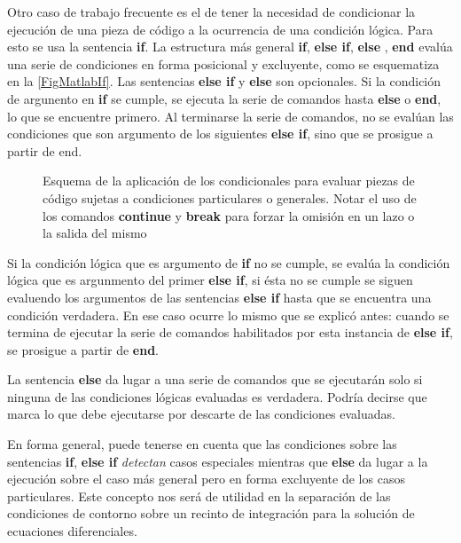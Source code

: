 
Otro caso de trabajo frecuente es el de tener 
la necesidad de condicionar la ejecución de 
una pieza de código a la ocurrencia de una 
condición lógica. Para esto se usa la sentencia
\textbf{if}. La estructura más general \textbf{if},
\textbf{else if}, \textbf{else} , \textbf{end} evalúa
una serie de condiciones en forma posicional  y 
excluyente, como se esquematiza en la 
\autoref{FigMatlabIf}. Las sentencias \textbf{else if} y 
\textbf{else} son opcionales. Si la condición 
de argunento en \textbf{if} se cumple, se ejecuta
la serie de comandos hasta \textbf{else} o 
\textbf{end}, lo que se encuentre primero. Al 
terminarse la serie de comandos, no se evalúan 
las condiciones que son argumento de los 
siguientes \textbf{else if}, sino que se
prosigue a partir de end. 

\begin{figure}
  
  \caption{Esquema de la aplicación de los condicionales   para 
  evaluar piezas de código sujetas a condiciones 
  particulares o generales. Notar el uso de los comandos 
  \protect\textbf{continue} y \protect\textbf{break} para forzar la 
  omisión en un lazo o la salida del mismo
  \label{FigMatlabIf}
  }

\end{figure}

Si la condición lógica que es argumento de \textbf{if}
no se cumple, se evalúa 
la condición lógica que es argunmento del 
primer \textbf{else if}, si ésta no se cumple 
se siguen evaluendo los argumentos de las
sentencias \textbf{else if} hasta que se encuentra 
una condición verdadera. En ese caso ocurre lo 
mismo que se explicó antes: cuando se termina
de ejecutar la serie de comandos habilitados
por esta instancia de \textbf{else if}, se
prosigue a partir de \textbf{end}.

La sentencia \textbf{else} da lugar a una serie de
comandos que se ejecutarán solo si ninguna de las 
condiciones lógicas evaluadas es verdadera. 
Podría decirse que marca lo que debe ejecutarse por 
descarte de las condiciones evaluadas. 

En forma general, puede tenerse en cuenta que las 
condiciones sobre las sentencias \textbf{if}, 
\textbf{else if} \emph{ detectan} casos especiales
mientras que \textbf{else} da lugar a la ejecución
sobre el caso más general pero en forma 
excluyente de los casos particulares. Este 
concepto nos será de utilidad en la separación
de las condiciones de contorno sobre un 
recinto de integración para la solución
de ecuaciones diferenciales. 

\mode*
